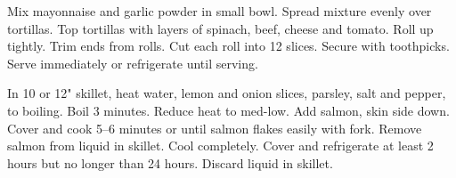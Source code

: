\begin{minipage}{\linewidth}
\end{minipage}\par\begin{minipage}{\linewidth} 
{Mix mayonnaise and garlic powder in small bowl. Spread mixture evenly over tortillas. Top tortillas with layers of spinach, beef, cheese and tomato. Roll up tightly. Trim ends from rolls. Cut each roll into 12 slices. Secure with toothpicks. Serve immediately or refrigerate until serving.}

\end{minipage}\par\begin{minipage}{\linewidth}   
{In 10 or 12" skillet, heat water, lemon and onion slices, parsley, salt and pepper, to boiling. Boil 3 minutes. Reduce heat to med-low. Add salmon, skin side down. Cover and cook 5--6 minutes or until salmon flakes easily with fork. Remove salmon from liquid in skillet. Cool completely. Cover and refrigerate at least 2 hours but no longer than 24 hours. Discard liquid in skillet.}


\end{minipage}
